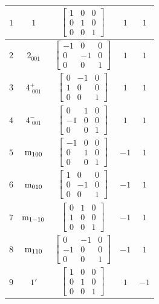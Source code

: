 \documentclass[fleqn,8pt]{jsarticle}
\begin{document}
\begin{longtable}{ccccc}
$ 1 $ & $ 1 $ & $ \begin{bmatrix} 1 & 0 & 0 \\ 0 & 1 & 0 \\ 0 & 0 & 1 \end{bmatrix} $ & $ 1 $ & $ 1 $ \\ \hline
$ 2 $ & $ 2{}_{001} $ & $ \begin{bmatrix} -1 & 0 & 0 \\ 0 & -1 & 0 \\ 0 & 0 & 1 \end{bmatrix} $ & $ 1 $ & $ 1 $ \\ \hline
$ 3 $ & $ 4^{+}_{\,\,001} $ & $ \begin{bmatrix} 0 & -1 & 0 \\ 1 & 0 & 0 \\ 0 & 0 & 1 \end{bmatrix} $ & $ 1 $ & $ 1 $ \\ \hline
$ 4 $ & $ 4^{-}_{\,\,001} $ & $ \begin{bmatrix} 0 & 1 & 0 \\ -1 & 0 & 0 \\ 0 & 0 & 1 \end{bmatrix} $ & $ 1 $ & $ 1 $ \\ \hline
$ 5 $ & $ {\rm m}_{100} $ & $ \begin{bmatrix} -1 & 0 & 0 \\ 0 & 1 & 0 \\ 0 & 0 & 1 \end{bmatrix} $ & $ -1 $ & $ 1 $ \\ \hline
$ 6 $ & $ {\rm m}_{010} $ & $ \begin{bmatrix} 1 & 0 & 0 \\ 0 & -1 & 0 \\ 0 & 0 & 1 \end{bmatrix} $ & $ -1 $ & $ 1 $ \\ \hline
$ 7 $ & $ {\rm m}_{1-10} $ & $ \begin{bmatrix} 0 & 1 & 0 \\ 1 & 0 & 0 \\ 0 & 0 & 1 \end{bmatrix} $ & $ -1 $ & $ 1 $ \\ \hline
$ 8 $ & $ {\rm m}_{110} $ & $ \begin{bmatrix} 0 & -1 & 0 \\ -1 & 0 & 0 \\ 0 & 0 & 1 \end{bmatrix} $ & $ -1 $ & $ 1 $ \\ \hline
$ 9 $ & $ 1{}' $ & $ \begin{bmatrix} 1 & 0 & 0 \\ 0 & 1 & 0 \\ 0 & 0 & 1 \end{bmatrix} $ & $ 1 $ & $ -1 $ \\ \hline

\end{longtable}
\end{document}
